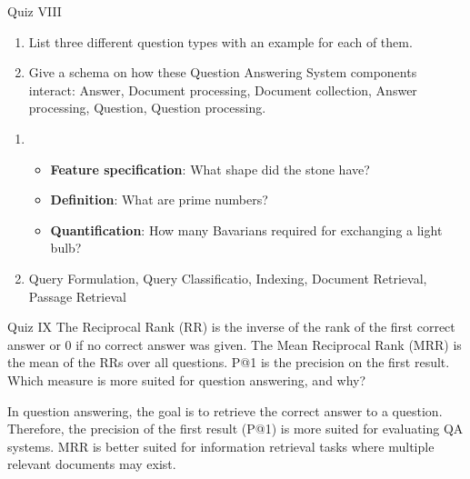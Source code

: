 \documentclass{article}
\begin{document}
\begin{exercise}{Quiz VIII}
  \begin{enumerate}
    \item List three different question types with an example for each of them.
    \item Give a schema on how these Question Answering System components interact: Answer, Document processing, Document collection, Answer processing, Question, Question processing.
  \end{enumerate}

  \begin{solution}
    \begin{enumerate}
      \item \begin{itemize}
          \item \textbf{Feature specification}: What shape did the stone have?
          \item \textbf{Definition}: What are prime numbers?
          \item \textbf{Quantification}: How many Bavarians required for exchanging a light bulb?
        \end{itemize}
      \item Query Formulation, Query Classificatio, Indexing, Document Retrieval, Passage Retrieval
        
    \end{enumerate}
  \end{solution}
\end{exercise}

\begin{exercise}{Quiz IX}
  The Reciprocal Rank (RR) is the inverse of the rank of the first correct answer or 0 if no correct answer was given. The Mean Reciprocal Rank (MRR) is the mean of the RRs over all questions. P@1 is the precision on the first result. Which measure is more suited for question answering, and why?

  \begin{solution}
    In question answering, the goal is to retrieve the correct answer to a question. Therefore, the precision of the first result (P@1) is more suited for evaluating QA systems. MRR is better suited for information retrieval tasks where multiple relevant documents may exist.
  \end{solution}
\end{exercise}
\end{document}
